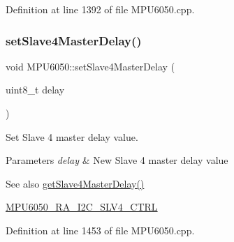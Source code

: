 Definition at line 1392 of file M\+P\+U6050.\+cpp.


\begin{DoxyCode}{0}

\end{DoxyCode}
\mbox{\label{classMPU6050_ac154934a43c599cdc564fb29c22c45eb}} 
\subsubsection{\texorpdfstring{setSlave4MasterDelay()}{setSlave4MasterDelay()}}
{\footnotesize\ttfamily void M\+P\+U6050\+::set\+Slave4\+Master\+Delay (\begin{DoxyParamCaption}\item[{uint8\+\_\+t}]{delay }\end{DoxyParamCaption})}

Set Slave 4 master delay value. 
\begin{DoxyParams}{Parameters}
{\em delay} & New Slave 4 master delay value \\
\hline
\end{DoxyParams}
\begin{DoxySeeAlso}{See also}
\mbox{\hyperlink{classMPU6050_a9a4585b3c9e61478db198011107a56a9}{get\+Slave4\+Master\+Delay()}} 

\mbox{\hyperlink{MPU6050_8h_a2b6fbfceb145ba1c8b19f51475fd7a5d}{M\+P\+U6050\+\_\+\+R\+A\+\_\+\+I2\+C\+\_\+\+S\+L\+V4\+\_\+\+C\+T\+RL}} 
\end{DoxySeeAlso}


Definition at line 1453 of file M\+P\+U6050.\+cpp.


